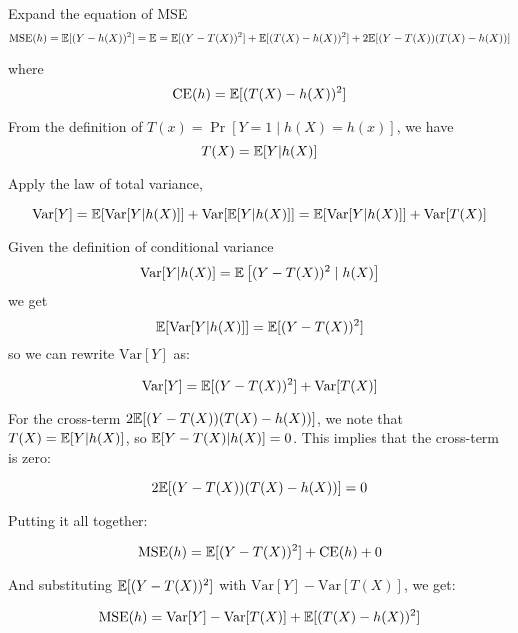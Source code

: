 \begin{answer}

Expand the equation of MSE
\begin{equation}
\text{MSE}(h) = \mathbb{E}[(Y - h(X))^2] = \mathbb{E} = \mathbb{E}[(Y - T(X))^2] + \mathbb{E}[(T(X) - h(X))^2] + 2\mathbb{E}[(Y - T(X))(T(X) - h(X))]
\end{equation}

where 
\begin{equation}
    \text{CE}(h) = \mathbb{E}[(T(X) - h(X))^2]
\end{equation}

From the definition of $T(x) = \Pr [Y =1 \mid h(X) = h(x)]$, we have 
\begin{equation}
    T(X) = \mathbb{E}[Y | h(X)]
\end{equation} 

Apply the law of total variance, 

\begin{equation}
\text{Var}[Y] = \mathbb{E}[\text{Var}[Y | h(X)]] + \text{Var}[\mathbb{E}[Y | h(X)]] = \mathbb{E}[\text{Var}[Y | h(X)]] + \text{Var}[T(X)]
\end{equation} 

Given the definition of conditional variance 
\begin{equation}
    \text{Var}[Y | h(X)] = \mathbb{E}\left[(Y - T(X))^2 \mid h(X)\right]
\end{equation}
we get 
\begin{equation}
    \mathbb{E}[\text{Var}[Y | h(X)]] = \mathbb{E}[(Y - T(X))^2]
\end{equation}
so we can rewrite $\text{Var}[Y]$ as:

\begin{equation}
    \text{Var}[Y] = \mathbb{E}[(Y - T(X))^2] + \text{Var}[T(X)]
\end{equation}


For the cross-term \(2\mathbb{E}[(Y - T(X))(T(X) - h(X))]\), we note that \(T(X) = \mathbb{E}[Y | h(X)]\), so \(\mathbb{E}[Y - T(X) | h(X)] = 0\). This implies that the cross-term is zero:

\begin{equation}
2\mathbb{E}[(Y - T(X))(T(X) - h(X))] = 0
\end{equation}

Putting it all together:

\begin{equation}
\text{MSE}(h) = \mathbb{E}[(Y - T(X))^2] + \text{CE}(h) + 0
\end{equation}

And substituting \(\mathbb{E}[(Y - T(X))^2]\) with \(\text{Var}[Y] - \text{Var}[T(X)]\), we get:

\begin{equation}
\text{MSE}(h) = \text{Var}[Y] - \text{Var}[T(X)] + \mathbb{E}[(T(X) - h(X))^2]
\end{equation}


\end{answer}